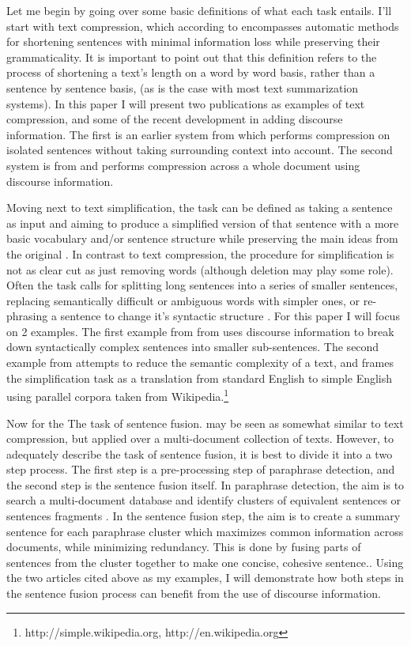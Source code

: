 {Let me begin by going over some basic definitions of what each task entails.  I'll start with text compression, which according to \citet{Clarke:2010:DCD:1950488.1950493} encompasses automatic methods for shortening sentences with minimal information loss while preserving their grammaticality.  It is important to point out that this definition refers to the process of shortening a text's length on a word by word basis, rather than a sentence by sentence basis, (as is the case with most text summarization systems). In this paper I will present two publications as examples of text compression, and some of the recent development in adding discourse information.  The first is an earlier system from \citet{} which performs compression on isolated sentences without taking surrounding context into account.  The second system is from \citet{Clarke:2010:DCD:1950488.1950493} and performs compression across a whole document using discourse information.  

{Moving next to text simplification, the task can be defined as taking a sentence as input and aiming to produce a simplified version of that sentence with a more basic vocabulary and/or sentence structure while preserving the main ideas from the original \citet{Feng2008}.  In contrast to text compression, the procedure for simplification is not as clear cut as just removing words (although deletion may play some role). Often the task calls for splitting long sentences into a series of smaller sentences, replacing semantically difficult or ambiguous words with simpler ones, or re-phrasing a sentence to change it's syntactic structure \citep{coster-kauchak:2011:T2TW-2011}.  For this paper I will focus on 2 examples. The first example from from \citet{Siddharthan2006} uses discourse information to break down syntactically complex sentences into smaller sub-sentences.  The second example from \citet{coster-kauchak:2011:T2TW-2011} attempts to reduce the semantic complexity of a text, and frames the simplification task as a translation from standard English to simple English using parallel corpora taken from Wikipedia.\footnote{http://simple.wikipedia.org,	http://en.wikipedia.org}}
 
{Now for the The task of sentence fusion. may be seen as somewhat similar to text compression, but applied over a multi-document collection of texts.  However, to adequately describe the task of sentence fusion, it is best to divide it into a two step process. The first step is a pre-processing step of paraphrase detection, and the second step is the sentence fusion itself.  In paraphrase detection, the aim is to search a multi-document database  and identify clusters of equivalent sentences or sentences fragments \citep{Regneri:2012:UDI:2390948.2391048}. In the sentence fusion step, the aim is to create a summary sentence for each paraphrase cluster which maximizes common information across documents, while minimizing redundancy.  This is done by fusing parts of sentences from the cluster together to make one concise, cohesive sentence.\citep{Filippova:2008:SFV:1613715.1613741}.  Using the two articles cited above as my examples, I will demonstrate how both steps in the sentence fusion process can benefit from the use of discourse information.}

}
